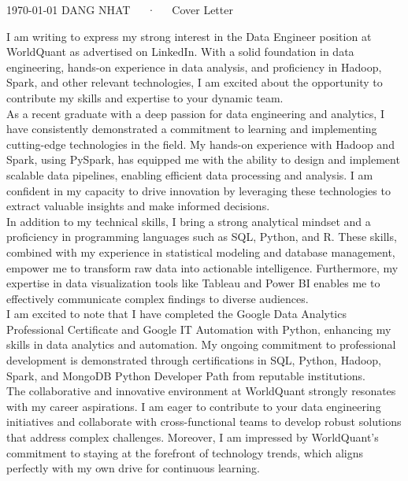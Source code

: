 \documentclass[11pt, a4paper]{awesome-cv}
\begin{document}
\makecvheader[R]

\makecvfooter
  {\today}
  {DANG NHAT~~~·~~~Cover Letter}
  {}

\makelettertitle

\begin{cvletter}
I am writing to express my strong interest in the Data Engineer position at WorldQuant as advertised on LinkedIn. With a solid foundation in data engineering, hands-on experience in data analysis, and proficiency in Hadoop, Spark, and other relevant technologies, I am excited about the opportunity to contribute my skills and expertise to your dynamic team.
\\As a recent graduate with a deep passion for data engineering and analytics, I have consistently demonstrated a commitment to learning and implementing cutting-edge technologies in the field. My hands-on experience with Hadoop and Spark, using PySpark, has equipped me with the ability to design and implement scalable data pipelines, enabling efficient data processing and analysis. I am confident in my capacity to drive innovation by leveraging these technologies to extract valuable insights and make informed decisions.
\\In addition to my technical skills, I bring a strong analytical mindset and a proficiency in programming languages such as SQL, Python, and R. These skills, combined with my experience in statistical modeling and database management, empower me to transform raw data into actionable intelligence. Furthermore, my expertise in data visualization tools like Tableau and Power BI enables me to effectively communicate complex findings to diverse audiences.
\\I am excited to note that I have completed the Google Data Analytics Professional Certificate and Google IT Automation with Python, enhancing my skills in data analytics and automation. My ongoing commitment to professional development is demonstrated through certifications in SQL, Python, Hadoop, Spark, and MongoDB Python Developer Path from reputable institutions.
\\The collaborative and innovative environment at WorldQuant strongly resonates with my career aspirations. I am eager to contribute to your data engineering initiatives and collaborate with cross-functional teams to develop robust solutions that address complex challenges. Moreover, I am impressed by WorldQuant's commitment to staying at the forefront of technology trends, which aligns perfectly with my own drive for continuous learning.

\end{cvletter}
\end{document}
